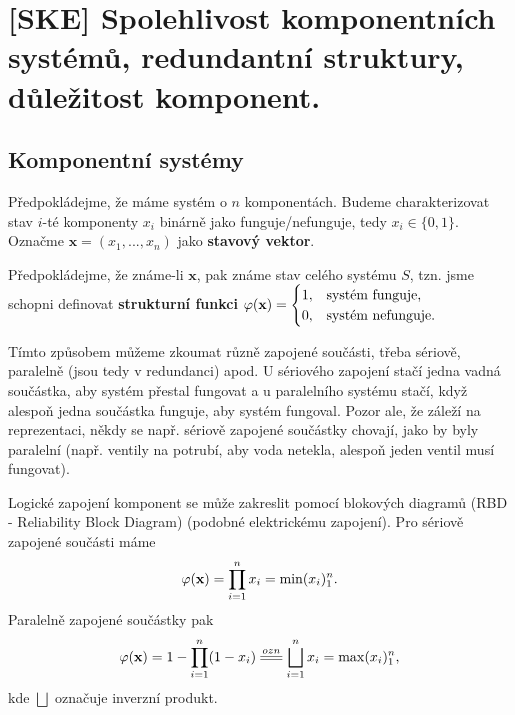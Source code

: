 \chapter{[SKE] Spolehlivost komponentních systémů, redundantní struktury, důležitost komponent.}

\section{Komponentní systémy}
    \begin{define}
        Předpokládejme, že máme systém o $n$ komponentách. Budeme charakterizovat stav $i$-té komponenty $x_i$ binárně jako funguje/nefunguje, tedy $x_i\in\{0,1\}$. Označme $\textbf{x}=(x_1,...,x_n)$ jako \textbf{stavový vektor}. 
        
        Předpokládejme, že známe-li $\textbf{x}$, pak známe stav celého systému $S$, tzn. jsme schopni definovat \textbf{strukturní funkci} $\crossedphi(\textbf{x})=\begin{cases}
        1,&\text{systém funguje,}\\0,&\text{systém nefunguje.}
        \end{cases}$
    \end{define}

    Tímto způsobem můžeme zkoumat různě zapojené součásti, třeba sériově, 
    paralelně (jsou tedy v redundanci) apod. U sériového zapojení stačí 
    jedna vadná součástka, aby systém přestal fungovat a u paralelního 
    systému stačí, když alespoň jedna součástka funguje, aby systém 
    fungoval. Pozor ale, že záleží na reprezentaci, někdy se např. sériově 
    zapojené součástky chovají, jako by byly paralelní (např. ventily na 
    potrubí, aby voda netekla, alespoň jeden ventil musí fungovat).

    \begin{corollary}
        Logické zapojení komponent se může zakreslit pomocí blokových diagramů (RBD - Reliability Block Diagram) (podobné elektrickému zapojení). Pro sériově zapojené součásti máme 
        $$ \crossedphi(\textbf{x})=\prod_{i=1}^{n}x_i=\min(x_i)_1^n.$$
        Paralelně zapojené součástky pak
        $$ \crossedphi(\textbf{x})=1-\prod_{i=1}^{n}(1-x_i)\equal{ozn}\bigsqcup_{i=1}^n x_i=\max(x_i)_1^n, $$ kde $\bigsqcup$ označuje inverzní produkt.
    \end{corollary}

